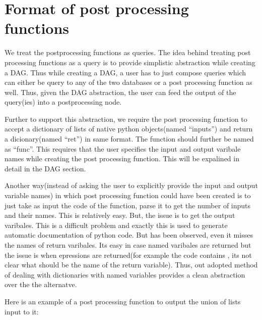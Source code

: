 \documentclass[letterpaper,10pt,english]{sphinxmanual}
\begin{document}
\section{Format of post processing functions}
\label{\detokenize{postprocessing:format-of-post-processing-functions}}
We treat the postprocessing functions as queries. The idea behind treating post processing functions as a query is to provide simplistic abstraction while creating a DAG. Thus while creating a DAG, a user has to just compose queries which can either be query to any of the two databases or a post processing function as well. Thus, given the DAG abstraction, the user can feed the output of the query(ies) into a postprocessing node.

Further to support this abstraction, we require the post processing function to accept a dictionary of lists of native python objects(named “inputs”) and return a dicionary(named “ret”) in same format. The function should further be named as “func”. This requires that the user specifies the input and output varibale names while creating the post processing function. This will be expalined in detail in the DAG section.

Another way(instead of asking the user to explicitly provide the input and output variable names) in which post processing function could have been created is to just take as input the code of the function, parse it to get the number of inputs and their names. This is relatively easy. But, the issue is to get the output varibales. This is a difficult problem and exactly this is used to generate automatic documentation of python code. But has been observed, even it misses the names of return varibales. Its easy in case named varibales are returned but the issue is when epressions are returned(for example the code contains , its not clear what should be the name of the return variable). Thus, out adopted method of dealing with dictionaries with named variables provides a clean abstraction over the the alternatve.

Here is an example of a post processing function to output the union of lists input to it:
\end{document}
